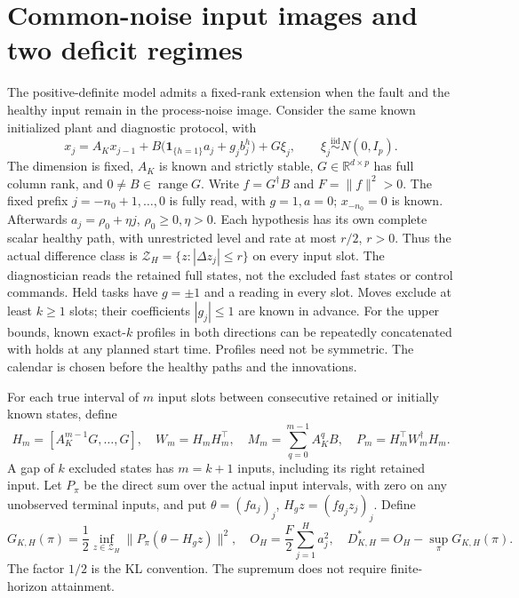 \documentclass[11pt]{article}
\begin{document}
\section{Common-noise input images and two deficit regimes}
\label{m2sreg:section}

The positive-definite model admits a fixed-rank extension when the fault
and the healthy input remain in the process-noise image. Consider the
same known initialized plant and diagnostic protocol, with
\begin{equation}\label{m2sreg:plant}
x_j=A_Kx_{j-1}+B\bigl(\mathbf1_{\{h=1\}}a_j+g_jb_j^h\bigr)+G\xi_j,
\qquad \xi_j\overset{\mathrm{iid}}{\sim}N(0,I_p).
\end{equation}
The dimension is fixed, $A_K$ is known and strictly stable,
$G\in\mathbb R^{d\times p}$ has full column rank, and
$0\ne B\in\operatorname{range}G$. Write
$f=G^\dagger B$ and $F=\|f\|^2>0$.
The fixed prefix $j=-n_0+1,\ldots,0$ is fully read, with $g=1,a=0$;
$x_{-n_0}=0$ is known. Afterwards $a_j=\rho_0+\eta j$,
$\rho_0\ge0,\eta>0$. Each hypothesis has its own complete scalar
healthy path, with unrestricted level and rate at most $r/2$, $r>0$.
Thus the actual difference class is
$\mathcal Z_H=\{z:|\Delta z_j|\le r\}$ on every input slot.
The diagnostician reads the retained full states, not the excluded fast
states or control commands. Held tasks have $g=\pm1$ and a reading in
every slot. Moves exclude at least $k\ge1$ slots; their coefficients
$|g_j|\le1$ are known in advance. For the upper bounds, known
exact-$k$ profiles in both directions can be repeatedly concatenated
with holds at any planned start time. Profiles need not be symmetric.
The calendar is chosen before the healthy paths and the innovations.

For each true interval of $m$ input slots between consecutive
retained or initially known states, define
\begin{equation}\label{m2sreg:interval}
H_m=[A_K^{m-1}G,\ldots,G],\quad W_m=H_mH_m^\top,\quad
M_m=\sum_{q=0}^{m-1}A_K^qB,\quad P_m=H_m^\top W_m^\dagger H_m .
\end{equation}
A gap of $k$ excluded states has $m=k+1$ inputs, including its right
retained input. Let $P_\pi$ be the direct sum over the actual input
intervals, with zero on any unobserved terminal inputs, and put
$\theta=(fa_j)_j$, $H_gz=(fg_jz_j)_j$.
Define
\begin{equation}\label{m2sreg:information}
G_{K,H}(\pi)=\frac12\inf_{z\in\mathcal Z_H}
 \|P_\pi(\theta-H_gz)\|^2,\quad
O_H=\frac F2\sum_{j=1}^Ha_j^2,\quad
D_{K,H}^*=O_H-\sup_\pi G_{K,H}(\pi).
\end{equation}
The factor $1/2$ is the KL convention. The supremum does not require
finite-horizon attainment.
\end{document}
